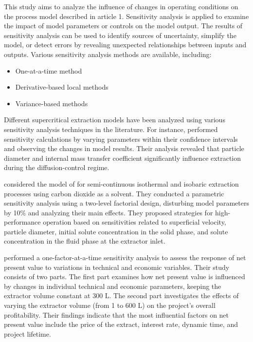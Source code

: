 \documentclass[../Article_Sensitivity_Analsysis.tex]{subfiles}
\begin{document}
	
	
	This study aims to analyze the influence of changes in operating conditions on the process model described in {\color{red}article 1}. Sensitivity analysis is applied to examine the impact of model parameters or controls on the model output. The results of sensitivity analysis can be used to identify sources of uncertainty, simplify the model, or detect errors by revealing unexpected relationships between inputs and outputs. Various sensitivity analysis methods are available, including:
	
	\begin{itemize}
		\item One-at-a-time method
		\item Derivative-based local methods
		\item Variance-based methods
	\end{itemize}
	
	Different supercritical extraction models have been analyzed using various sensitivity analysis techniques in the literature. For instance, \citet{Fiori_2007} performed sensitivity calculations by varying parameters within their confidence intervals and observing the changes in model results. Their analysis revealed that particle diameter and internal mass transfer coefficient significantly influence extraction during the diffusion-control regime.
	
	\citet{Santos2000} considered the model of \citet{Sovova1994} for semi-continuous isothermal and isobaric extraction processes using carbon dioxide as a solvent. They conducted a parametric sensitivity analysis using a two-level factorial design, disturbing model parameters by 10\% and analyzing their main effects. They proposed strategies for high-performance operation based on sensitivities related to superficial velocity, particle diameter, initial solute concentration in the solid phase, and solute concentration in the fluid phase at the extractor inlet.
	
	\citet{Hatami2024} performed a one-factor-at-a-time sensitivity analysis to assess the response of net present value to variations in technical and economic variables. Their study consists of two parts. The first part examines how net present value is influenced by changes in individual technical and economic parameters, keeping the extractor volume constant at 300 L. The second part investigates the effects of varying the extractor volume (from 1 to 600 L) on the project's overall profitability. Their findings indicate that the most influential factors on net present value include the price of the extract, interest rate, dynamic time, and project lifetime.
	
	
\end{document}
